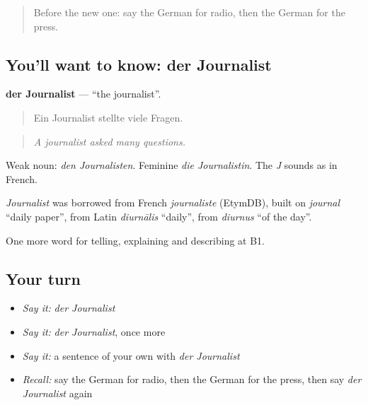 \label{lesson:GE-C272-journalist}



\begin{quote}
Before the new one: say the German for radio, then the German for the press.
\end{quote}

\subsection*{You'll want to know: der Journalist}
\textbf{der Journalist} — \textquotedblleft{}the journalist\textquotedblright{}.

\begin{quote}
Ein Journalist stellte viele Fragen.
\end{quote}

\begin{quote}
\emph{A journalist asked many questions.}
\end{quote}

Weak noun: \emph{den Journalisten}. Feminine \emph{die Journalistin}. The \emph{J} sounds as in French.

\begin{cousinweb}
\emph{Journalist} was borrowed from French \emph{journaliste} (EtymDB), built on \emph{journal} \textquotedblleft{}daily paper\textquotedblright{}, from Latin \emph{diurnālis} \textquotedblleft{}daily\textquotedblright{}, from \emph{diurnus} \textquotedblleft{}of the day\textquotedblright{}.
\end{cousinweb}

\begin{grammarlens}[title={What you've built}]
One more word for telling, explaining and describing at B1.
\end{grammarlens}

\subsection*{Your turn}
\begin{itemize}
\raggedright
  \item \emph{Say it:} \emph{der Journalist}
  \item \emph{Say it:} \emph{der Journalist}, once more
  \item \emph{Say it:} a sentence of your own with \emph{der Journalist}
  \item \emph{Recall:} say the German for radio, then the German for the press, then say \emph{der Journalist} again
\end{itemize}

